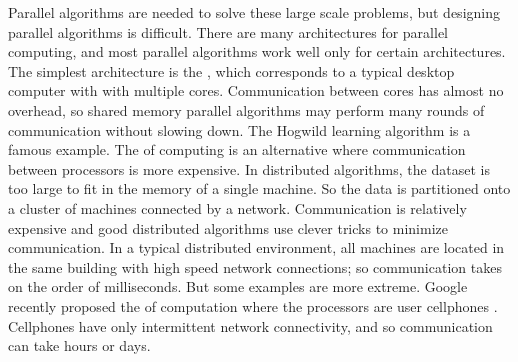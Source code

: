 \documentclass[thesis.tex]{subfiles}
\begin{document}

Parallel algorithms are needed to solve these large scale problems,
but designing parallel algorithms is difficult.
There are many architectures for parallel computing,
and most parallel algorithms work well only for certain architectures.
The simplest architecture is the ,
which corresponds to a typical desktop computer with with multiple cores.
Communication between cores has almost no overhead,
so shared memory parallel algorithms may perform many rounds of communication without slowing down.
The Hogwild learning algorithm \citep{recht2011hogwild} is a famous example. 
The  of computing is an alternative where communication between processors is more expensive.
In distributed algorithms,
the dataset is too large to fit in the memory of a single machine.
So the data is partitioned onto a cluster of machines connected by a network.
Communication is relatively expensive and good distributed algorithms use clever tricks to minimize communication.
In a typical distributed environment,
all machines are located in the same building with high speed network connections;
so communication takes on the order of milliseconds.
But some examples are more extreme.
Google recently proposed the  of computation where the processors are user cellphones \citep{mcmahan2017communication}.
Cellphones have only intermittent network connectivity,
and so communication can take hours or days.
\end{document}
